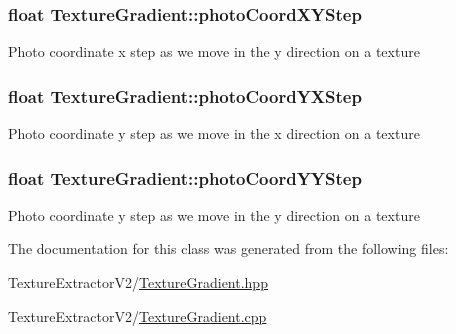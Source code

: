 \subsubsection[{photo\+Coord\+X\+Y\+Step}]{\setlength{\rightskip}{0pt plus 5cm}float Texture\+Gradient\+::photo\+Coord\+X\+Y\+Step}\label{class_texture_gradient_ad667fab8a0c76c19fdb5d27510b5a9ba}
Photo coordinate x step as we move in the y direction on a texture \hypertarget{class_texture_gradient_af13ceccfc1629d08233d025c1d060992}{}
\subsubsection[{photo\+Coord\+Y\+X\+Step}]{\setlength{\rightskip}{0pt plus 5cm}float Texture\+Gradient\+::photo\+Coord\+Y\+X\+Step}\label{class_texture_gradient_af13ceccfc1629d08233d025c1d060992}
Photo coordinate y step as we move in the x direction on a texture \hypertarget{class_texture_gradient_a12b19a4e9245a4c71f9bb1c36f40f94d}{}
\subsubsection[{photo\+Coord\+Y\+Y\+Step}]{\setlength{\rightskip}{0pt plus 5cm}float Texture\+Gradient\+::photo\+Coord\+Y\+Y\+Step}\label{class_texture_gradient_a12b19a4e9245a4c71f9bb1c36f40f94d}
Photo coordinate y step as we move in the y direction on a texture 

The documentation for this class was generated from the following files\+:\begin{DoxyCompactItemize}
\item 
Texture\+Extractor\+V2/\hyperlink{_texture_gradient_8hpp}{Texture\+Gradient.\+hpp}\item 
Texture\+Extractor\+V2/\hyperlink{_texture_gradient_8cpp}{Texture\+Gradient.\+cpp}\end{DoxyCompactItemize}
